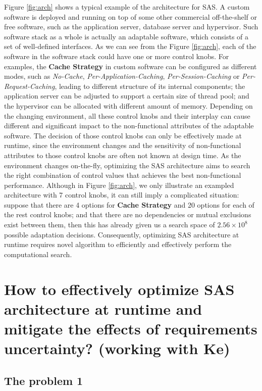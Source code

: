 \documentclass[DIV15,a4paper]{scrartcl}
\begin{document}
Figure \ref{fig:arch} shows a typical example of the architecture for SAS. A custom software is deployed and running on top of some other commercial off-the-shelf or free software, such as the application server, database server and hypervisor. Such software stack as a whole is actually an adaptable software, which consists of a set of well-defined interfaces. As we can see from the Figure \ref{fig:arch}, each of the software in the software stack could have one or more control knobs. For examples, the \textbf{Cache Strategy} in custom software can be configured as different modes, such as \emph{No-Cache}, \emph{Per-Application-Caching}, \emph{Per-Session-Caching} or \emph{Per-Request-Caching}, leading to different structure of its internal components; the application server can be adjusted to support a certain size of thread pool; and the hypervisor can be allocated with different amount of memory. Depending on the changing environment, all these control knobs and their interplay can cause different and significant impact to the non-functional attributes of the adaptable software. The decision of those control knobs can only be effectively made at runtime, since the environment changes and the sensitivity of non-functional attributes to those control knobs are often not known at design time. As the environment changes on-the-fly, optimizing the SAS architecture aims to search the right combination of control values that achieves the best non-functional performance. Although in Figure \ref{fig:arch}, we only illustrate an exampled architecture with 7 control knobs, it can still imply a complicated situation: suppose that there are 4 options for \textbf{Cache Strategy} and 20 options for each of the rest control knobs; and that there are no dependencies or mutual exclusions exist between them, then this has already given us a search space of $2.56 \times 10^8$ possible adaptation decisions. Consequently, optimizing SAS architecture at runtime requires novel algorithm to efficiently and effectively perform the computational search.

\section{How to effectively optimize SAS architecture at runtime and mitigate the effects of requirements uncertainty? (working with Ke)}

\subsection{The problem 1}
\end{document}
